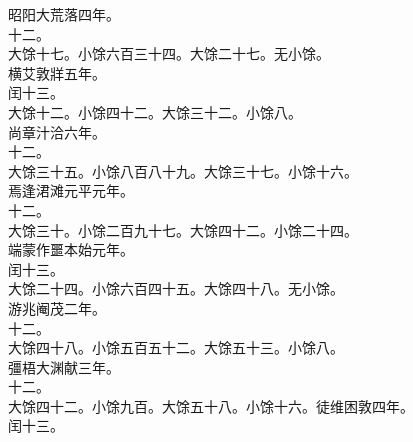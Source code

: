 \documentclass{zhvt-classic}
\begin{document}
\hspace*{2em}昭阳大荒落四年。\\
\hspace*{2em}十二。\\
\hspace*{2em}大馀十七。小馀六百三十四。大馀二十七。无小馀。\\
\hspace*{2em}横艾敦牂五年。\\
\hspace*{2em}闰十三。\\
\hspace*{2em}大馀十二。小馀四十二。大馀三十二。小馀八。\\
\hspace*{2em}尚章汁洽六年。\\
\hspace*{2em}十二。\\
\hspace*{2em}大馀三十五。小馀八百八十九。大馀三十七。小馀十六。\\
\hspace*{2em}焉逢涒滩元平元年。\\
\hspace*{2em}十二。\\
\hspace*{2em}大馀三十。小馀二百九十七。大馀四十二。小馀二十四。\\
\hspace*{2em}端蒙作噩本始元年。\\
\hspace*{2em}闰十三。\\
\hspace*{2em}大馀二十四。小馀六百四十五。大馀四十八。无小馀。\\
\hspace*{2em}游兆阉茂二年。\\
\hspace*{2em}十二。\\
\hspace*{2em}大馀四十八。小馀五百五十二。大馀五十三。小馀八。\\
\hspace*{2em}彊梧大渊献三年。\\
\hspace*{2em}十二。\\
\hspace*{2em}大馀四十二。小馀九百。大馀五十八。小馀十六。徒维困敦四年。\\
\hspace*{2em}闰十三。\\
\end{document}
